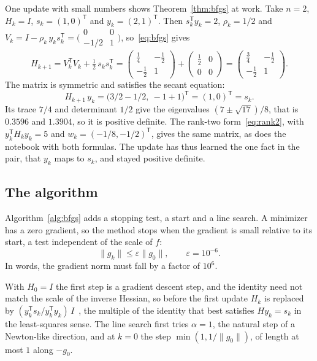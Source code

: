 \documentclass[11pt,a4paper]{amsart}
\numberwithin{equation}{section}
\theoremstyle{plain}
\theoremstyle{definition}
\theoremstyle{remark}
\newcommand{\T}{\mathsf{T}}
\newcommand{\norm}[1]{\lVert #1 \rVert}
\begin{document}
One update with small numbers shows Theorem~\ref{thm:bfgs} at work. Take
$n = 2$, $H_k = I$, $s_k = (1, 0)^\T$ and $y_k = (2, 1)^\T$. Then
$s_k^\T y_k = 2$, $\rho_k = 1/2$ and
$V_k = I - \rho_k\, y_k s_k^\T
= \bigl(\begin{smallmatrix} 0 & 0 \\ -1/2 & 1 \end{smallmatrix}\bigr)$,
so~\eqref{eq:bfgs} gives
\[
  H_{k+1} = V_k^\T V_k + \tfrac12\, s_k s_k^\T
  = \begin{pmatrix} \tfrac14 & -\tfrac12 \\ -\tfrac12 & 1 \end{pmatrix}
  + \begin{pmatrix} \tfrac12 & 0 \\ 0 & 0 \end{pmatrix}
  = \begin{pmatrix} \tfrac34 & -\tfrac12 \\ -\tfrac12 & 1 \end{pmatrix}.
\]
The matrix is symmetric and satisfies the secant equation:
\[
  H_{k+1}\, y_k = \bigl(3/2 - 1/2,\ -1 + 1\bigr)^\T = (1, 0)^\T = s_k .
\]
Its trace $7/4$ and
determinant $1/2$ give the eigenvalues $(7 \pm \sqrt{17})/8$, that is
$0.3596$ and $1.3904$, so it is positive definite. The rank-two
form~\eqref{eq:rank2}, with $y_k^\T H_k y_k = 5$ and
$w_k = (-1/8, -1/2)^\T$, gives the same matrix, as does the notebook
with both formulas. The update has thus learned the one fact in the
pair, that $y_k$ maps to $s_k$, and stayed positive definite.

\subsection{The algorithm}\label{sec:algorithm}

Algorithm~\ref{alg:bfgs} adds a stopping test, a start and a line
search. A minimizer has a zero gradient, so the method stops when the
gradient is small relative to its start, a test independent of the scale
of $f$:
\begin{equation}\label{eq:stop}
  \norm{g_k} \leq \varepsilon \norm{g_0},
  \qquad \varepsilon = 10^{-6}.
\end{equation}
In words, the gradient norm must fall by a factor of $10^6$.

With $H_0 = I$ the first step is a gradient descent step, and the
identity need not match the scale of the inverse Hessian, so before the
first update $H_k$ is replaced by
$(y_k^\T s_k / y_k^\T y_k)\, I$~\cite[(6.20)]{nocedal2006}, the
multiple of the identity that best satisfies $H y_k = s_k$ in the
least-squares sense. The line search first tries $\alpha = 1$, the
natural step of a Newton-like direction, and at $k = 0$ the step
$\min(1, 1/\norm{g_0})$, of length at most $1$ along $-g_0$.
\end{document}
